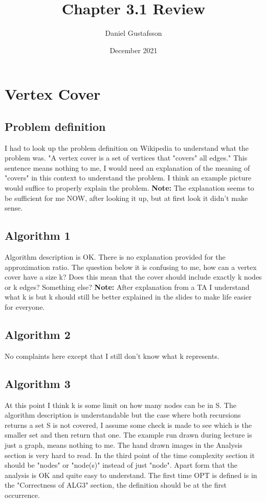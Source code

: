 \documentclass[11pt, a4paper]{article}
\title{Chapter 3.1 Review}
\author{Daniel Gustafsson}
\date{December 2021}
\begin{document}
\maketitle

\section{Vertex Cover}
\subsection{Problem definition}
I had to look up the problem definition on Wikipedia to understand what the problem was.
"A vertex cover is a set of vertices that "covers" all edges." This sentence means nothing to me,
I would need an explanation of the meaning of "covers" in this context to understand the problem.
I think an example picture would suffice to properly explain the problem.
\newline
\textbf{Note:} The explanation seems to be sufficient for me NOW, after looking it up, but at first
look it didn't make sense.

\subsection{Algorithm 1}
Algorithm description is OK. There is no explanation provided for the approximation ratio. 
\newline
The question below it is confusing to me, how can a vertex cover
have a size k? Does this mean that the cover should include exactly k nodes or k edges? Something else?
\newline
\textbf{Note:} After explanation from a TA I understand what k is but k should still be better explained in the slides
to make life easier for everyone.

\subsection{Algorithm 2}
No complaints here except that I still don't know what k represents.

\subsection{Algorithm 3}
At this point I think k is some limit on how many nodes can be in S.
The algorithm description is understandable but the case where both recursions returns a set S
is not covered, I assume some check is made to see which is the smaller set and then return that one.
\newline
The example run drawn during lecture is just a graph, means nothing to me.
\newline
The hand drawn images in the Analysis section is very hard to read.
\newline
In the third point of the time complexity section it should be "nodes" or "node(s)" instead of just "node".
Apart form that the analysis is OK and quite easy to understand.
\newline
The first time OPT is defined is in the "Correctness of ALG3" section, the definition should be at the first
occurrence.
\end{document}
